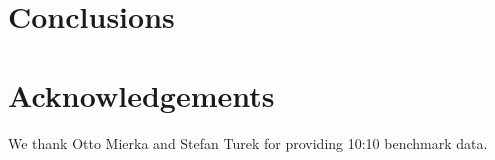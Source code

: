 \documentclass{jfm}
\begin{document}
\section{Conclusions\label{sec:conclusion}}


 
\section*{Acknowledgements} 
We thank Otto Mierka and Stefan Turek for providing 10:10 benchmark data. 









\end{document}
